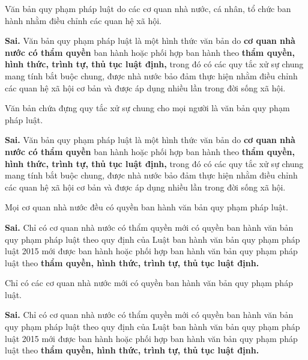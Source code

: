 \begin{ques}
Văn bản quy phạm pháp luật do các cơ quan nhà nước, cá nhân, tổ chức ban hành nhằm điều chỉnh các quan hệ xã hội.
\end{ques}
\begin{ans}
\textbf{Sai.} Văn bản quy phạm pháp luật là một hình thức văn bản do \textbf{cơ quan nhà nước có thẩm quyền} ban hành hoặc phối hợp ban hành theo \textbf{thẩm quyền, hình thức, trình tự, thủ tục luật định,} trong đó có các quy tắc xử sự chung mang tính bắt buộc chung, được nhà nước bảo đảm thực hiện nhằm điều chỉnh các quan hệ xã hội cơ bản và được áp dụng nhiều lần trong đời sống xã hội.
\end{ans}

\begin{ques}
Văn bản chứa đựng quy tắc xử sự chung cho mọi người là văn bản quy phạm pháp luật.
\end{ques}
\begin{ans}
\textbf{Sai.} Văn bản quy phạm pháp luật là một hình thức văn bản do \textbf{cơ quan nhà nước có thẩm quyền} ban hành hoặc phối hợp ban hành theo \textbf{thẩm quyền, hình thức, trình tự, thủ tục luật định,} trong đó có các quy tắc xử sự chung mang tính bắt buộc chung, được nhà nước bảo đảm thực hiện nhằm điều chỉnh các quan hệ xã hội cơ bản và được áp dụng nhiều lần trong đời sống xã hội.
\end{ans}

\begin{ques}
Mọi cơ quan nhà nước đều có quyền ban hành văn bản quy phạm pháp luật.
\end{ques}
\begin{ans}
\textbf{Sai.} Chỉ có cơ quan nhà nước có thẩm quyền mới có quyền ban hành văn bản quy phạm pháp luật theo quy định của Luật ban hành văn bản quy phạm pháp luật 2015 mới được ban hành hoặc phối hợp ban hành văn bản quy phạm pháp luật theo \textbf{thẩm quyền, hình thức, trình tự, thủ tục luật định.}
\end{ans}

\begin{ques}
Chỉ có các cơ quan nhà nước mới có quyền ban hành văn bản quy phạm pháp luật.
\end{ques}
\begin{ans}
\textbf{Sai.} Chỉ có cơ quan nhà nước có thẩm quyền mới có quyền ban hành văn bản quy phạm pháp luật theo quy định của Luật ban hành văn bản quy phạm pháp luật 2015 mới được ban hành hoặc phối hợp ban hành văn bản quy phạm pháp luật theo \textbf{thẩm quyền, hình thức, trình tự, thủ tục luật định.}
\end{ans}

